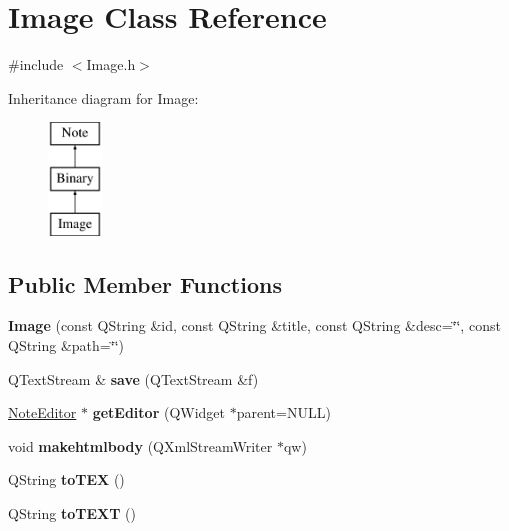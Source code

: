 \hypertarget{classImage}{\section{\-Image \-Class \-Reference}
\label{classImage}
}


{\ttfamily \#include $<$\-Image.\-h$>$}

\-Inheritance diagram for \-Image\-:\begin{figure}[H]
\begin{center}
\leavevmode
\includegraphics[height=3.000000cm]{classImage}
\end{center}
\end{figure}
\subsection*{\-Public \-Member \-Functions}
\begin{DoxyCompactItemize}
\item 
\hypertarget{classImage_ad8352740e64313fd59ecb27f814a2c11}{{\bfseries \-Image} (const \-Q\-String \&id, const \-Q\-String \&title, const \-Q\-String \&desc=\char`\"{}\char`\"{}, const \-Q\-String \&path=\char`\"{}\char`\"{})}\label{classImage_ad8352740e64313fd59ecb27f814a2c11}

\item 
\hypertarget{classImage_a98f8726f168ad1c4aebfe28ae9a7c6f1}{\-Q\-Text\-Stream \& {\bfseries save} (\-Q\-Text\-Stream \&f)}\label{classImage_a98f8726f168ad1c4aebfe28ae9a7c6f1}

\item 
\hypertarget{classImage_adae9c98aa0f9ae9ccc8d91f1010f0744}{\hyperlink{classNoteEditor}{\-Note\-Editor} $\ast$ {\bfseries get\-Editor} (\-Q\-Widget $\ast$parent=\-N\-U\-L\-L)}\label{classImage_adae9c98aa0f9ae9ccc8d91f1010f0744}

\item 
\hypertarget{classImage_acabd4dd144af756fe454e5373ac3e1ef}{void {\bfseries makehtmlbody} (\-Q\-Xml\-Stream\-Writer $\ast$qw)}\label{classImage_acabd4dd144af756fe454e5373ac3e1ef}

\item 
\hypertarget{classImage_aadaf100f24fa27f8cde5481bd93f23d3}{\-Q\-String {\bfseries to\-T\-E\-X} ()}\label{classImage_aadaf100f24fa27f8cde5481bd93f23d3}

\item 
\hypertarget{classImage_a3029299bc74b25b2aeb6238f8579627f}{\-Q\-String {\bfseries to\-T\-E\-X\-T} ()}\label{classImage_a3029299bc74b25b2aeb6238f8579627f}

\end{DoxyCompactItemize}


